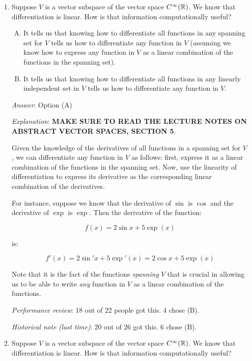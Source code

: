 \documentclass[10pt]{amsart}
\begin{document}
\vspace{0.5in}
\begin{enumerate}

\item Suppose $V$ is a vector subspace of the vector space
  $C^\infty(\mathbb{R})$. We know that differentiation is linear. How is that
  information computationally useful?

  \begin{enumerate}[(A)]
  \item It tells us that knowing how to differentiate all functions in
    any spanning set for $V$ tells us how to differentiate any
    function in $V$ (assuming we know how to express any function in
    $V$ as a linear combination of the functions in the spanning set).
  \item It tells us that knowing how to differentiate all functions in
    any linearly independent set in $V$ tells us how to differentiate any
    function in $V$.
  \end{enumerate}

  {\em Answer}: Option (A)

  {\em Explanation}: {\bf MAKE SURE TO READ THE LECTURE NOTES ON
    ABSTRACT VECTOR SPACES, SECTION 5}.

  Given the knowledge of the derivatives of all
  functions in a spanning set for $V$, we can differentiate any
  function in $V$ as follows: first, express it as a linear
  combination of the functions in the spanning set. Now, use the
  linearity of differentiation to express its derivative as the
  corresponding linear combination of the derivatives.

  For instance, suppose we know that the derivative of $\sin$ is
  $\cos$ and the derivative of $\exp$ is $\exp$. Then the derivative
  of the function:

  $$f(x) = 2\sin x + 5 \exp(x)$$

  is:

  $$f'(x) = 2\sin'x + 5 \exp'(x) = 2\cos x + 5\exp(x)$$

  Note that it is the fact of the functions {\em spanning} $V$ that is
  crucial in allowing us to be able to write {\em any} function in $V$
  as a linear combination of the functions.

  {\em Performance review}: 18 out of 22 people got this. 4 chose (B).

  {\em Historical note (last time)}: $20$ out of $26$ got this. $6$ chose (B).

\item Suppose $V$ is a vector subspace of the vector space
  $C^\infty(\mathbb{R})$. We know that differentiation is linear. How
  is that information computationally useful?


\end{enumerate}
\end{document}
